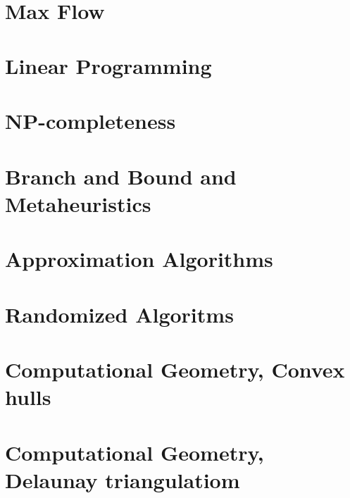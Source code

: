 \documentclass[10pt]{article}
\author{\authorName \\\texttt{\small{\authorEmail}}}
\title{\textsc{\titleName \\ \courseName}}
\begin{document}
\maketitle 


\section{Max Flow} %
\label{sec:max_flow}


\section{Linear Programming} %
\label{sec:linear_programming}


\section{NP-completeness} %
\label{sec:np_completeness}


\section{Branch and Bound and Metaheuristics} %
\label{sec:branch_and_bound_and_metaheuristics}


\section{Approximation Algorithms} %
\label{sec:approximation_algorithms}


\section{Randomized Algoritms} %
\label{sec:randomized_algoritms}


\section{Computational Geometry, Convex hulls} %
\label{sec:computational_geometry_convex_hulls}


\section{Computational Geometry, Delaunay triangulatiom} %
\label{sec:computational_geometry_delaunay_triangulatiom}

\end{document}
